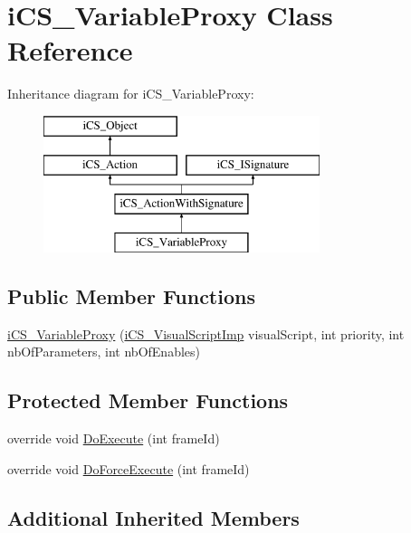 \hypertarget{classi_c_s___variable_proxy}{\section{i\+C\+S\+\_\+\+Variable\+Proxy Class Reference}
\label{classi_c_s___variable_proxy}
}
Inheritance diagram for i\+C\+S\+\_\+\+Variable\+Proxy\+:\begin{figure}[H]
\begin{center}
\leavevmode
\includegraphics[height=4.000000cm]{classi_c_s___variable_proxy}
\end{center}
\end{figure}
\subsection*{Public Member Functions}
\begin{DoxyCompactItemize}
\item 
\hyperlink{classi_c_s___variable_proxy_ab86e44b07f763a15bfba191f8c706422}{i\+C\+S\+\_\+\+Variable\+Proxy} (\hyperlink{classi_c_s___visual_script_imp}{i\+C\+S\+\_\+\+Visual\+Script\+Imp} visual\+Script, int priority, int nb\+Of\+Parameters, int nb\+Of\+Enables)
\end{DoxyCompactItemize}
\subsection*{Protected Member Functions}
\begin{DoxyCompactItemize}
\item 
override void \hyperlink{classi_c_s___variable_proxy_aa1d4793f3a1e6ef537e5139353393f2a}{Do\+Execute} (int frame\+Id)
\item 
override void \hyperlink{classi_c_s___variable_proxy_af6c0b7d4328daca5def6a5ddf1ac659e}{Do\+Force\+Execute} (int frame\+Id)
\end{DoxyCompactItemize}
\subsection*{Additional Inherited Members}


